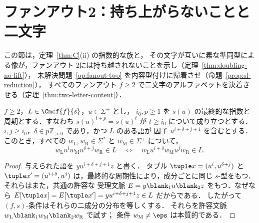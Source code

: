\section{ファンアウト2：持ち上がらないことと二文字}
\label{sec:fanout-two}
\label{subsec:power-transfer}

この節は，定理~\ref{thm:C}(ii) の指数的な族と，
その文字が互いに素な準同型による像が，ファンアウト
2には持ち越されないことを示し（定理~\ref{thm:doubling-no-lift}），
未解決問題~\ref{op:fanout-two} を内容型付けに帰着させ（命題~\ref{prop:sl-reduction}），
すべてのファンアウト $f\ge2$ で二文字のアルファベットを決着させる（定理~\ref{thm:two-letter-content}）．

\begin{lemma}[二つのタプル成分にわたる冪の移送]
\label{lem:power-transfer}
$f\ge2$，$L\in\Cmcf{f}{s}$，$u\in\Sigma^+$ とし，
$i_0,p\ge1$ を $s(u)$ の最終的な指数と周期とする．すなわち
$s(u)^{t+p}=s(u)^t$ が $t\ge i_0$ について成り立つとする．
$i,j\ge i_0$，$\delta\in p\mathbb Z_{>0}$ であり，かつ $L$ のある語が
因子 $u^{i+\delta+j+1}$ を含むとする．このとき，すべての
$w_{\mathrm L},w_{\mathrm R}\in\Sigma^*$ と $w_{\mathrm M}\in\Sigma^+$ について，
\[
 w_{\mathrm L}u^iw_{\mathrm M}u^{\delta+j}w_{\mathrm R}\in L\quad\Longleftrightarrow\quad
 w_{\mathrm L}u^{i+\delta}w_{\mathrm M}u^jw_{\mathrm R}\in L.
\]
\end{lemma}
\begin{proof}
与えられた語を $yu^{i+\delta+j+1}z$ と書く．
タプル $\tuple x=(u^i,u^{\delta+j})$ と
$\tuple x'=(u^{i+\delta},u^j)$ は，最終的な周期性により，成分ごとに同じ $s$-型をもつ．
それらはまた，共通の許容な
受理文脈 $E=y\blank_1u\blank_2z$ をもつ．なぜなら
$E[\tuple x]=E[\tuple x']=yu^{i+\delta+j+1}z\in L$ だからである．
したがって $(f,s)$-条件はそれらの二成分の分布を等しくする．
それらを許容文脈 $w_{\mathrm L}\blank_1w_{\mathrm M}\blank_2w_{\mathrm R}$ で試す；
条件 $w_{\mathrm M}\ne\eps$ は本質的である．
\end{proof}

